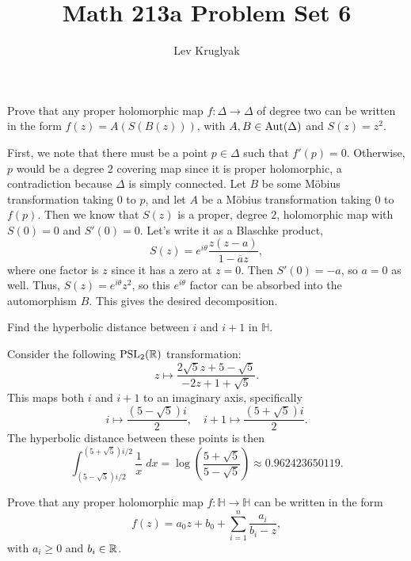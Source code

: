 \documentclass{pset}
\title{Math 213a Problem Set 6}
\author{Lev Kruglyak}
\begin{document}
\maketitle
\collaborators
\begin{problem}{2.9}
  Prove that any proper holomorphic map $f : \Delta \to \Delta$ of degree two can be written in the form $f(z) = A(S(B(z)))$, with $A, B\in \textrm{Aut}(\Delta)$ and $S(z)=z^2$.
\end{problem}

\begin{solution}
  First, we note that there must be a point $p\in \Delta$ such that $f'(p)=0$. Otherwise, $p$ would be a degree $2$ covering map since it is proper holomorphic, a contradiction because $\Delta$ is simply connected. Let $B$ be some M\"obius transformation taking $0$ to $p$, and let $A$ be a M\"obius transformation taking $0$ to $f(p)$. Then we know that $S(z)$ is a proper, degree $2$, holomorphic map with $S(0)=0$ and $S'(0)=0$. Let's write it as a Blaschke product,
  \[
    S(z) = e^{i\theta}\frac{z(z-a)}{1-\overline{a}z},
  \]
  where one factor is $z$ since it has a zero at $z=0$. Then $S'(0)=-a$, so $a=0$ as well. Thus, $S(z)=e^{i\theta}z^2$, so this $e^{i\theta}$ factor can be absorbed into the automorphism $B$. This gives the desired decomposition.
\end{solution}

\begin{problem}{2.13}
  Find the hyperbolic distance between $i$ and $i+1$ in $\mathbb{H}$.
\end{problem}

\begin{solution}
  Consider the following $\textrm{PSL}_2(\mathbb{R})$ transformation:
  \[
    z \mapsto \frac{2\sqrt{5}z + 5-\sqrt{5}}{-2z+1+\sqrt{5}}.
  \]
  This maps both $i$ and $i+1$ to an imaginary axis, specifically
  \[
    i \mapsto \frac{(5-\sqrt{5})i}{2},\quad i+1\mapsto \frac{(5+\sqrt{5})i}{2}.
  \]
  The hyperbolic distance between these points is then
  \[
    \int_{(5-\sqrt{5})i/2}^{(5+\sqrt{5})i/2} \frac{1}{x}\;dx = \log\left(\frac{5+\sqrt{5}}{5-\sqrt{5}}\right) \approx 0.962423650119.
  \]
\end{solution}

\begin{problem}{2.14}
  Prove that any proper holomorphic map $f : \mathbb{H} \to \mathbb{H}$ can be written in the form
  \[f(z) = a_0 z + b_0 + \sum^n_{i=1} \frac{a_i}{b_i - z},\]
  with $a_i \geq 0$ and $b_i \in \mathbb{R}$.
\end{problem}
\end{document}
